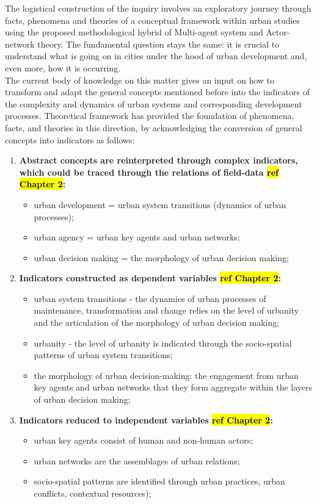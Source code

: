 \documentclass[11pt]{report}
\begin{document}
The logistical construction of the inquiry involves an exploratory journey through facts, phenomena and theories of a conceptual framework within urban studies using the proposed methodological hybrid of Multi-agent system and Actor-network theory. The fundamental question stays the same: it is crucial to understand what is going on in cities under the hood of urban development and, even more, how it is occurring.
\\
The current body of knowledge on this matter gives an input on how to transform and adapt the general concepts mentioned before into the indicators of the complexity and dynamics of urban systems and corresponding development processes. Theoretical framework has provided the foundation of phenomena, facts, and theories in this direction, by acknowledging the conversion of general concepts into indicators as follows:
\begin{enumerate}
\item \textbf{Abstract concepts are reinterpreted through complex indicators, which could be traced through the relations of field-data \hl{ref Chapter 2}:}
\begin{itemize}
\item urban development = urban system transitions (dynamics of urban processes);
\item urban agency = urban key agents and urban networks;
\item urban decision making = the morphology of urban decision making;
\end{itemize}

\item \textbf{Indicators constructed as dependent variables \hl{ref Chapter 2}:}
\begin{itemize}
\item urban system transitions - the dynamics of urban processes of maintenance, transformation and change relies on the level of urbanity and the articulation of the morphology of urban decision making;
\item urbanity - the level of urbanity is indicated through the socio-spatial patterns of urban system transitions;
\item the morphology of urban decision-making: the engagement from urban key agents and urban networks that they form aggregate within the layers of urban decision making;
\end{itemize}

\item \textbf{Indicators reduced to independent variables \hl{ref Chapter 2}:}
\begin{itemize}
\item urban key agents consist of human and non-human actors;
\item urban networks are the assemblages of urban relations;
\item socio-spatial patterns are identified through urban practices, urban conflicts, contextual resources);
\end{itemize}
\end{enumerate}
\end{document}
